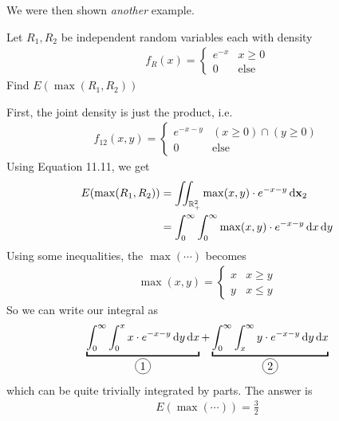 We were then shown \textit{another} example.
\begin{example}
    Let $R_1,R_2$ be independent random variables each with density
    \begin{align}
        f_R(x) = \begin{cases}
            e^{-x} & x \ge 0\\
            0 & \text{else}
        \end{cases}
    \end{align}
    Find $E(\max(R_1,R_2))$
\end{example}
\begin{solution}
    First, the joint density is just the product, i.e.
    \begin{align}
        f_{12}(x,y) = \begin{cases}
            e^{-x-y} & (x \ge 0) \cap (y \ge 0)\\
            0 & \text{else}
        \end{cases}
    \end{align}
    Using Equation 11.11, we get
    \begin{align}
        E(\max(R_1,R_2)) &= \iint_{\mathbb{R}^2_+} \max(x,y) \cdot e^{-x-y} \dd{\vb{x}_2}\\
        &= \int_0^\infty \int_0^\infty \max(x,y) \cdot e^{-x-y} \dd{x}\dd{y}
    \end{align}
    Using some inequalities, the $\max(\cdots)$ becomes
    \begin{align}
        \max(x,y) = \begin{cases}
            x & x \ge y\\
            y & x \le y
        \end{cases}
    \end{align}
    So we can write our integral as
    \begin{align}
        \underbracket{\int_0^\infty \int_0^x x \cdot e^{-x-y} \dd{y}\dd{x}}_{\circled{1}} + \underbracket{\int_0^\infty \int_x^\infty y \cdot e^{-x-y} \dd{y}\dd{x}}_{\circled{2}}
    \end{align}
    which can be quite trivially integrated by parts. The answer is
    \begin{align}
        E(\max(\cdots)) = \frac{3}{2}
    \end{align}
\end{solution}

